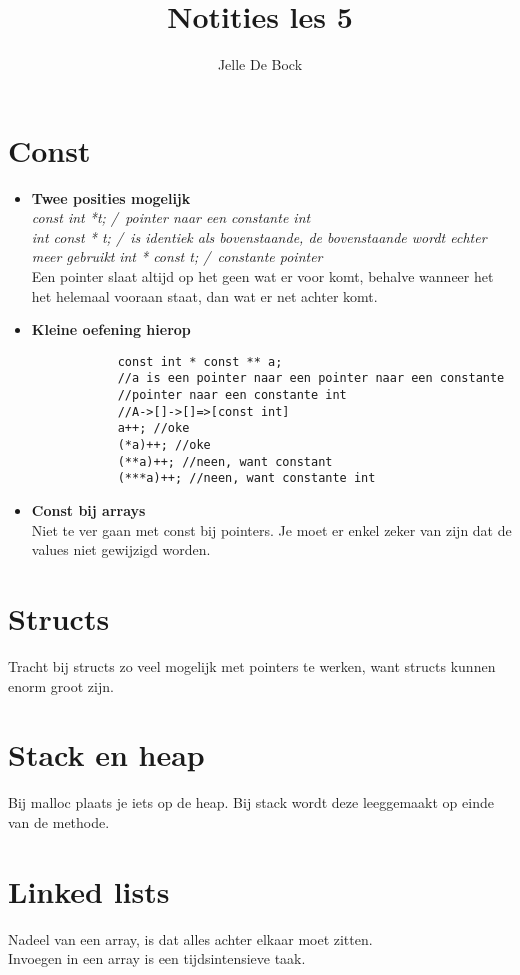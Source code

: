 \documentclass{article}
\title{Notities les 5}
\author{Jelle De Bock}
\begin{document}
\maketitle
\section{Const}
\begin{itemize}
    \item \textbf{Twee posities mogelijk} \\
            \textit{const int *t; /\/\ pointer naar een constante int}\\
            \textit{int const * t; /\/\ is identiek als bovenstaande, de bovenstaande wordt echter meer gebruikt  }
            \textit{int * const t; /\/\ constante pointer}\\
           Een pointer slaat altijd op het geen wat er voor komt, behalve wanneer het het helemaal vooraan staat, dan wat er net achter komt.
    \item \textbf{Kleine oefening hierop} \\
        \begin{lstlisting}
            const int * const ** a;
            //a is een pointer naar een pointer naar een constante
            //pointer naar een constante int
            //A->[]->[]=>[const int]
            a++; //oke
            (*a)++; //oke
            (**a)++; //neen, want constant
            (***a)++; //neen, want constante int
        \end{lstlisting}
    \item \textbf{Const bij arrays} \\
            Niet te ver gaan met const bij pointers. Je moet er enkel zeker van zijn dat de values niet gewijzigd worden.
\end{itemize}
\section{Structs}
   Tracht bij structs zo veel mogelijk met pointers te werken, want structs kunnen enorm groot zijn. 
\section{Stack en heap}
    Bij malloc plaats je iets op de heap. Bij stack wordt deze leeggemaakt op einde van de methode.
\section{Linked lists}
Nadeel van een array, is dat alles achter elkaar moet zitten. \\
Invoegen in een array is een tijdsintensieve taak.
\end{document}
